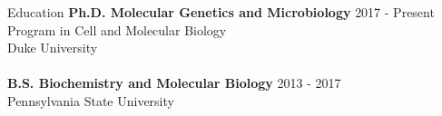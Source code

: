 \documentclass{resume} %
\begin{document}





\begin{rSection}{Education}
{\bf Ph.D. Molecular Genetics and Microbiology } \hfill {2017 - Present} 
\\ Program in Cell and Molecular Biology
\\ Duke University
\\ \\
{\bf B.S. Biochemistry and Molecular Biology} \hfill {2013 - 2017} 
\\ Pennsylvania State University
\\
\end{rSection}
\end{document}
